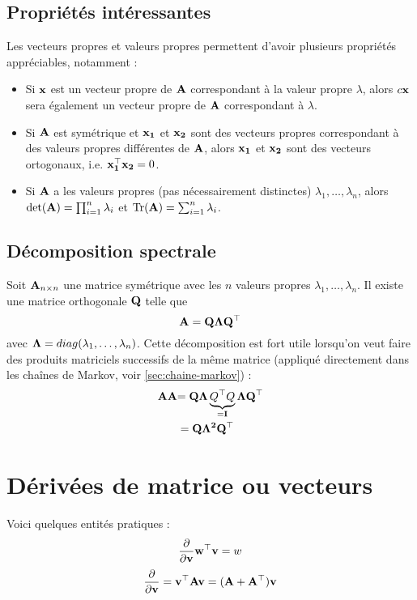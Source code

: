 \subsection{Propriétés intéressantes}
Les vecteurs propres et valeurs propres permettent d'avoir plusieurs propriétés appréciables, notamment : 
\begin{itemize}
\item Si $\mathbf{x}$ est un vecteur propre de $\mathbf{A}$ correspondant à la valeur propre $\lambda$, alors $c\mathbf{x}$ sera également un vecteur propre de $\mathbf{A}$ correspondant à $\lambda$.
\item Si $\mathbf{A}$ est symétrique et $\mathbf{x_1}$ et $\mathbf{x_2}$ sont des vecteurs propres correspondant à des valeurs propres différentes de $\mathbf{A}$, alors $\mathbf{x_1}$ et $\mathbf{x_2}$ sont des vecteurs ortogonaux, i.e. $\mathbf{x_{1}^{\top} x_2}  =0$.
\item Si $\mathbf{A}$ a les valeurs propres (pas nécessairement distinctes) $\lambda_1, \dots, \lambda_n$, alors $\det(\mathbf{A}) = \prod_{i=1}^{n} \lambda_i$ et $\operatorname{Tr}(\mathbf{A}) = \sum_{i=1}^{n} \lambda_i$.
\end{itemize}

\subsection{Décomposition spectrale} Soit $\mathbf{A}_{n\times n}$ une matrice symétrique avec les $n$ valeurs propres $\lambda_1, \dots, \lambda_n$. Il existe une matrice orthogonale $\mathbf{Q}$ telle que
\begin{equation}
\label{eq:decomposition-spectrale}
\mathbf{A = Q \Lambda Q^{\top}}
\end{equation}
avec $\mathbf{\Lambda} = diag(\lambda_1, \dots , \lambda_n)$. Cette décomposition est fort utile lorsqu'on veut faire des produits matriciels successifs de la même matrice (appliqué directement dans les chaînes de Markov, voir \autoref{sec:chaine-markov}) : 
\begin{align*}
\mathbf{AA} & \mathbf{= Q \Lambda \underbrace{Q^{\top} Q}_{=I} \Lambda Q^{\top} } \\
 & = \mathbf{Q \Lambda^2 Q^{\top}}
\end{align*}

\section{Dérivées de matrice ou vecteurs}
Voici quelques entités pratiques : 
\begin{align*}
\frac{\partial}{\partial \mathbf{v}} \mathbf{w^{\top} v} = w
\end{align*}
\begin{align*}
\frac{\partial}{\partial \mathbf{v}} = \mathbf{v^{\top} A v = (A + A^{\top})v}
\end{align*}